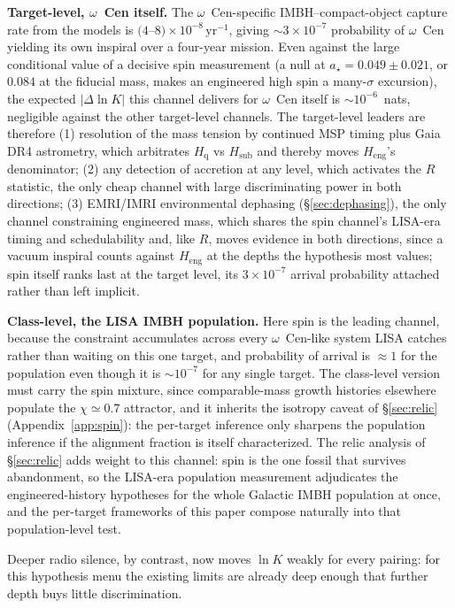 \documentclass[11pt]{article}
\newcommand{\astar}{\ensuremath{a_\star}}
\newcommand{\ocen}{\ensuremath{\omega}~Cen}
\newcommand{\lnK}{\ensuremath{\ln K}}
\newcommand{\Heng}{\ensuremath{H_{\mathrm{eng}}}}
\newcommand{\Hgas}{\ensuremath{H_{\mathrm{q}}}}
\newcommand{\Hsub}{\ensuremath{H_{\mathrm{sub}}}}
\begin{document}
\begin{itemize}
\textbf{Target-level, \ocen{} itself.} The \ocen-specific IMBH--compact-object capture rate from the \citet{GonzalezPrieto2025} models is $(4$--$8)\times10^{-8}\,\mathrm{yr^{-1}}$, giving $\sim 3\times10^{-7}$ probability of \ocen{} yielding its own inspiral over a four-year mission. Even against the large conditional value of a decisive spin measurement (a null at $\astar = 0.049 \pm 0.021$, or $0.084$ at the fiducial mass, makes an engineered high spin a many-$\sigma$ excursion), the expected $|\Delta\lnK|$ this channel delivers for \ocen{} itself is $\sim 10^{-6}$~nats, negligible against the other target-level channels. The target-level leaders are therefore (1) resolution of the mass tension by continued MSP timing plus Gaia DR4 astrometry, which arbitrates \Hgas{} vs \Hsub{} and thereby moves \Heng's denominator; (2) any detection of accretion at any level, which activates the $R$ statistic, the only cheap channel with large discriminating power in both directions; (3) EMRI/IMRI environmental dephasing (\S\ref{sec:dephasing}), the only channel constraining engineered mass, which shares the spin channel's LISA-era timing and schedulability and, like $R$, moves evidence in both directions, since a vacuum inspiral counts against \Heng{} at the depths the hypothesis most values; spin itself ranks last at the target level, its $3\times10^{-7}$ arrival probability attached rather than left implicit.

\textbf{Class-level, the LISA IMBH population.} Here spin is the leading channel, because the constraint accumulates across every \ocen-like system LISA catches rather than waiting on this one target, and probability of arrival is $\approx 1$ for the population even though it is $\sim 10^{-7}$ for any single target. The class-level version must carry the spin mixture, since comparable-mass growth histories elsewhere populate the $\chi \simeq 0.7$ attractor, and it inherits the isotropy caveat of \S\ref{sec:relic} (Appendix~\ref{app:spin}): the per-target inference only sharpens the population inference if the alignment fraction is itself characterized. The relic analysis of \S\ref{sec:relic} adds weight to this channel: spin is the one fossil that survives abandonment, so the LISA-era population measurement adjudicates the engineered-history hypotheses for the whole Galactic IMBH population at once, and the per-target frameworks of this paper compose naturally into that population-level test.

Deeper radio silence, by contrast, now moves \lnK{} weakly for every pairing: for this hypothesis menu the existing limits are already deep enough that further depth buys little discrimination.
\end{itemize}
\end{document}
